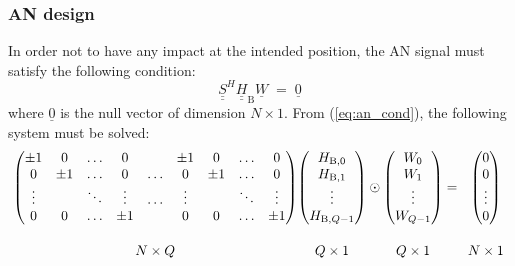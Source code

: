 \documentclass[conference]{IEEEtran}
\begin{document}
\subsubsection{AN design}
In order not to have any impact at the intended position, the AN signal must satisfy the following condition:
\begin{equation}
    \underline{\underline{S}}^H\underline{\underline{H}}_{\text{B}} \underline{W} \; = \; \underline{0}
    \label{eq:an_cond}
\end{equation}
where $\underline{0}$ is the null vector of dimension $N\times 1$. From (\ref{eq:an_cond}), the following system must be solved:
\begin{equation}
\resizebox{1.3\hsize}{!}{
    $
    \underset{\begin{array}{c}\\ N\times Q \end{array}}%
{%
    \begin{pmatrix}
    \pm 1 & 0 & \hdots & 0 & & \pm 1 & 0 & \hdots & 0  \\
    0 & \pm 1 & \hdots & 0 & \hdots & 0 & \pm 1 & \hdots & 0 \\
    \vdots & & \ddots & \vdots & \hdots & \vdots & & \ddots & \vdots \\
    0 & 0 & \hdots & \pm 1  & &0 & 0 & \hdots & \pm 1\\
    \end{pmatrix}
}
\underset{\begin{array}{c}\\ Q\times 1 \end{array}}%
{%
    \begin{pmatrix}
     H_{\text{B},0} \\
    H_{\text{B},1} \\
    \vdots \\
    H_{\text{B},Q-1}
    \end{pmatrix}
}
    \odot
\underset{\begin{array}{c}\\ Q\times 1 \end{array}}%
{%
    \begin{pmatrix}
    W_0 \\
    W_1 \\
    \vdots\\
    W_{Q-1}
    \end{pmatrix}
}
    = 
\underset{\begin{array}{c}\\ N\times 1 \end{array}}%
{%
    \begin{pmatrix}
    0\\
    0\\
    \vdots\\
    0
    \end{pmatrix}
}$}
    \label{eq:AN_generation}
\end{equation}
\end{document}

